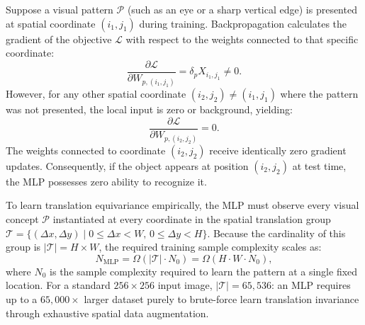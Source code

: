 Suppose a visual pattern $\mathcal{P}$ (such as an eye or a sharp vertical edge) is presented at spatial coordinate $(i_1, j_1)$ during training. Backpropagation calculates the gradient of the objective $\mathcal{L}$ with respect to the weights connected to that specific coordinate:
\begin{equation}
\frac{\partial \mathcal{L}}{\partial W_{p, (i_1, j_1)}} = \delta_p X_{i_1, j_1} \neq 0.
\end{equation}
However, for any other spatial coordinate $(i_2, j_2) \neq (i_1, j_1)$ where the pattern was not presented, the local input is zero or background, yielding:
\begin{equation}
\frac{\partial \mathcal{L}}{\partial W_{p, (i_2, j_2)}} = 0.
\end{equation}
The weights connected to coordinate $(i_2, j_2)$ receive identically zero gradient updates. Consequently, if the object appears at position $(i_2, j_2)$ at test time, the MLP possesses zero ability to recognize it.

To learn translation equivariance empirically, the MLP must observe every visual concept $\mathcal{P}$ instantiated at every coordinate in the spatial translation group $\mathcal{T} = \{(\Delta x, \Delta y) \mid 0 \le \Delta x < W, \, 0 \le \Delta y < H\}$. Because the cardinality of this group is $|\mathcal{T}| = H \times W$, the required training sample complexity scales as:
\begin{equation}
N_{\text{MLP}} = \Omega\left( |\mathcal{T}| \cdot N_0 \right) = \Omega\left( H \cdot W \cdot N_0 \right),
\label{eq:sample_complexity_mlp}
\end{equation}
where $N_0$ is the sample complexity required to learn the pattern at a single fixed location. For a standard $256 \times 256$ input image, $|\mathcal{T}| = 65,536$: an MLP requires up to a $65,000\times$ larger dataset purely to brute-force learn translation invariance through exhaustive spatial data augmentation.

